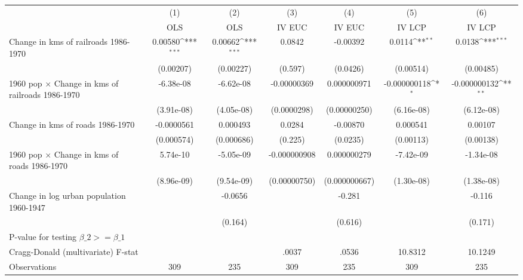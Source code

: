 {
\def\sym#1{\ifmmode^{#1}\else\(^{#1}\)\fi}
\begin{tabular}{l*{6}{c}}
\hline\hline
                &\multicolumn{1}{c}{(1)}&\multicolumn{1}{c}{(2)}&\multicolumn{1}{c}{(3)}&\multicolumn{1}{c}{(4)}&\multicolumn{1}{c}{(5)}&\multicolumn{1}{c}{(6)}\\
                &\multicolumn{1}{c}{OLS}&\multicolumn{1}{c}{OLS}&\multicolumn{1}{c}{IV EUC}&\multicolumn{1}{c}{IV EUC}&\multicolumn{1}{c}{IV LCP}&\multicolumn{1}{c}{IV LCP}\\
\hline
Change in kms of railroads 1986-1970&  0.00580\sym{***}&  0.00662\sym{***}&   0.0842         & -0.00392         &   0.0114\sym{**} &   0.0138\sym{***}\\
                &(0.00207)         &(0.00227)         &  (0.597)         & (0.0426)         &(0.00514)         &(0.00485)         \\
[1em]
1960 pop $\times$ Change in kms of railroads 1986-1970&-6.38e-08         &-6.62e-08         &-0.00000369         &0.000000971         &-0.000000118\sym{*}  &-0.000000132\sym{**} \\
                &(3.91e-08)         &(4.05e-08)         &(0.0000298)         &(0.00000250)         &(6.16e-08)         &(6.12e-08)         \\
[1em]
Change in kms of roads 1986-1970&-0.0000561         & 0.000493         &   0.0284         & -0.00870         & 0.000541         &  0.00107         \\
                &(0.000574)         &(0.000686)         &  (0.225)         & (0.0235)         &(0.00113)         &(0.00138)         \\
[1em]
1960 pop $\times$ Change in kms of roads 1986-1970& 5.74e-10         &-5.05e-09         &-0.000000908         &0.000000279         &-7.42e-09         &-1.34e-08         \\
                &(8.96e-09)         &(9.54e-09)         &(0.00000750)         &(0.000000667)         &(1.30e-08)         &(1.38e-08)         \\
[1em]
Change in log urban population 1960-1947&                  &  -0.0656         &                  &   -0.281         &                  &   -0.116         \\
                &                  &  (0.164)         &                  &  (0.616)         &                  &  (0.171)         \\
\hline
P-value for testing $\beta\_{2} >= \beta\_{1}$&                  &                  &                  &                  &                  &                  \\
Cragg-Donald (multivariate) F-stat&                  &                  &    .0037         &    .0536         &  10.8312         &  10.1249         \\
Observations    &      309         &      235         &      309         &      235         &      309         &      235         \\
\hline\hline
\end{tabular}
}
